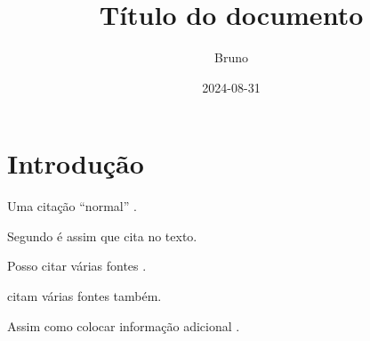 \documentclass[doc,male,12pt,a4paper]{ita}
\title{Título do documento}
\author{Bruno}
\date{2024-08-31}
\begin{document}
\frontmatter
\maketitle
\makecip

\tableofcontents

\mainmatter
\chapter{Introdução}
Uma citação ``normal'' \cite{silvaBIM4DNo2019}.

Segundo \textcite{dynamoDynamoBIM} é assim que cita no texto.

Posso citar várias fontes \cites{nrelEnergyPlus2024,ronzaniEstudoITAPara2020}.

\textcites{wenProgressTrendBIM2021,autodeskNavisworks3DModel2024} citam várias fontes também.

Assim como colocar informação adicional \cite[pre][post]{pauwelsIFCtoRDF2024}.

\printbibliography
\end{document}
